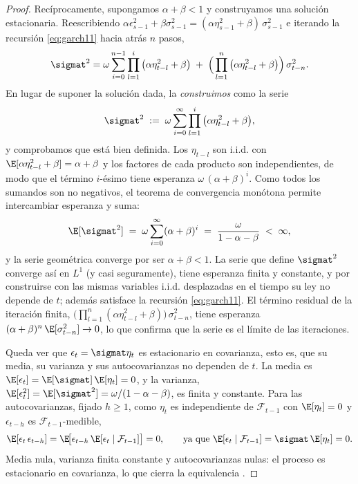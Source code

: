 \begin{proof}
Recíprocamente, supongamos $\alpha + \beta < 1$ y construyamos una solución estacionaria. Reescribiendo $\alpha \epsilon_{s-1}^2 + \beta \sigma_{s-1}^2 = (\alpha \eta_{s-1}^2 + \beta)\,\sigma_{s-1}^2$ e iterando la recursión \eqref{eq:garch11} hacia atrás $n$ pasos,
\[
\sigmat^2 = \omega \sum_{i=0}^{n-1} \prod_{l=1}^{i}\big(\alpha \eta_{t-l}^2 + \beta\big) \;+\; \Big(\prod_{l=1}^{n}\big(\alpha \eta_{t-l}^2 + \beta\big)\Big)\,\sigma_{t-n}^2.
\]
En lugar de suponer la solución dada, la \emph{construimos} como la serie
\[
\sigmat^2 \;:=\; \omega \sum_{i=0}^{\infty} \prod_{l=1}^{i}\big(\alpha \eta_{t-l}^2 + \beta\big),
\]
y comprobamos que está bien definida. Los $\eta_{t-l}$ son i.i.d. con $\E[\alpha \eta_{t-l}^2 + \beta] = \alpha + \beta$ y los factores de cada producto son independientes, de modo que el término $i$-ésimo tiene esperanza $\omega\,(\alpha+\beta)^i$. Como todos los sumandos son no negativos, el teorema de convergencia monótona permite intercambiar esperanza y suma:
\[
\E[\sigmat^2] \;=\; \omega \sum_{i=0}^{\infty} (\alpha+\beta)^i \;=\; \frac{\omega}{1-\alpha-\beta} \;<\; \infty,
\]
y la serie geométrica converge por ser $\alpha+\beta<1$. La serie que define $\sigmat^2$ converge así en $L^1$ (y casi seguramente), tiene esperanza finita y constante, y por construirse con las mismas variables i.i.d. desplazadas en el tiempo su ley no depende de $t$; además satisface la recursión \eqref{eq:garch11}. El término residual de la iteración finita, $\big(\prod_{l=1}^{n}(\alpha \eta_{t-l}^2+\beta)\big)\,\sigma_{t-n}^2$, tiene esperanza $(\alpha+\beta)^n\,\E[\sigma_{t-n}^2] \to 0$, lo que confirma que la serie es el límite de las iteraciones.

Queda ver que $\epsilon_t = \sigmat \eta_t$ es estacionario en covarianza, esto es, que su media, su varianza y sus autocovarianzas no dependen de $t$. La media es $\E[\epsilon_t] = \E[\sigmat]\,\E[\eta_t] = 0$, y la varianza, $\E[\epsilon_t^2] = \E[\sigmat^2] = \omega/(1-\alpha-\beta)$, es finita y constante. Para las autocovarianzas, fijado $h \ge 1$, como $\eta_t$ es independiente de $\mathcal{F}_{t-1}$ con $\E[\eta_t]=0$ y $\epsilon_{t-h}$ es $\mathcal{F}_{t-1}$-medible,
\[
\E[\epsilon_t\, \epsilon_{t-h}] = \E\!\big[\epsilon_{t-h}\,\E[\epsilon_t \mid \mathcal{F}_{t-1}]\big] = 0,
\qquad \text{ya que } \E[\epsilon_t \mid \mathcal{F}_{t-1}] = \sigmat\,\E[\eta_t] = 0.
\]
Media nula, varianza finita constante y autocovarianzas nulas: el proceso es estacionario en covarianza, lo que cierra la equivalencia \cite{nelson1990, francqzakoian2019}.
\end{proof}


